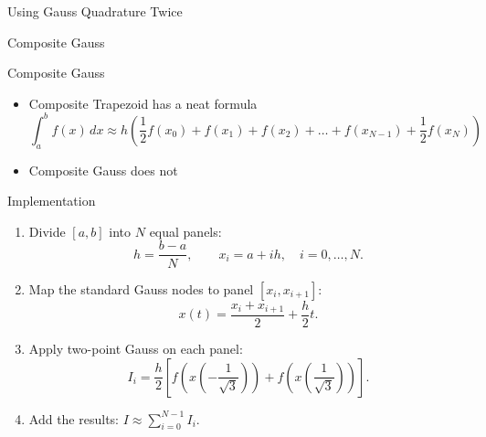 \documentclass[10pt]{beamer}
\begin{document}
\begin{frame}{Using Gauss Quadrature Twice}
{
        Composite Gauss 
    }
    \vspace{3mm}

\end{frame}
\begin{frame}{Composite Gauss}

\begin{itemize}
    \item Composite Trapezoid has a neat formula 
    $$
    \int_a^b f(x)\,dx \approx    h    \left(\frac{1}{2} f(x_0) +   f(x_1) +  f(x_2) + \dots +   f(x_{N-1}) + \frac{1}{2} f(x_N)\right)
    $$
        \vfill 
    \item Composite Gauss does not
        \vfill 
\end{itemize}
    
\end{frame}
\begin{frame}{Implementation}
\begin{enumerate}
    \item Divide $[a,b]$ into $N$ equal panels:
    \[
        h=\frac{b-a}{N}, \qquad x_i=a+ih,\quad i=0,\ldots,N.
    \]
    \item Map the standard Gauss nodes to panel $[x_i,x_{i+1}]$:
    \[
        x(t)=\frac{x_i+x_{i+1}}{2}+\frac{h}{2}t.
    \]
    \item Apply two-point Gauss on each panel:
    \[
        I_i=\frac{h}{2}\left[
        f\left(x\left(-\frac{1}{\sqrt{3}}\right)\right)
        +f\left(x\left(\frac{1}{\sqrt{3}}\right)\right)\right].
    \]
    \item Add the results: $\displaystyle I\approx\sum_{i=0}^{N-1} I_i$.
\end{enumerate}
\end{frame}
\end{document}

